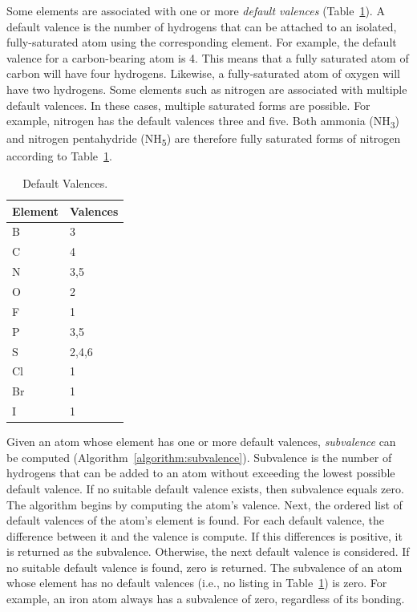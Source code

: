 \documentclass{article}
\begin{document}
Some elements are associated with one or more \textit{default valences} (Table~\ref{table:default-valences}). A default valence is the number of hydrogens that can be attached to an isolated, fully-saturated atom using the corresponding element. For example, the default valence for a carbon-bearing atom is 4. This means that a fully saturated atom of carbon will have four hydrogens. Likewise, a fully-saturated atom of oxygen will have two hydrogens. Some elements such as nitrogen are associated with multiple default valences. In these cases, multiple saturated forms are possible. For example, nitrogen has the default valences three and five. Both ammonia (NH\textsubscript{3}) and nitrogen pentahydride (NH\textsubscript{5}) are therefore fully saturated forms of nitrogen according to Table~\ref{table:default-valences}.

\begin{table}
    \caption{Default Valences.}
    \centering
    \begin{tabular}{l l}
        \hline
        Element & Valences \\
        \hline
        B & 3 \\
        C & 4 \\
        N & 3,5 \\
        O & 2 \\
        F & 1 \\
        P & 3,5 \\
        S & 2,4,6 \\
        Cl & 1 \\
        Br & 1 \\
        I & 1 \\
        \hline
    \end{tabular}
    \label{table:default-valences}
\end{table}

Given an atom whose element has one or more default valences, \textit{subvalence} can be computed (Algorithm~\ref{algorithm:subvalence}). Subvalence is the number of hydrogens that can be added to an atom without exceeding the lowest possible default valence. If no suitable default valence exists, then subvalence equals zero. The algorithm begins by computing the atom's valence. Next, the ordered list of default valences of the atom's element is found. For each default valence, the difference between it and the valence is compute. If this differences is positive, it is returned as the subvalence. Otherwise, the next default valence is considered. If no suitable default valence is found, zero is returned. The subvalence of an atom whose element has no default valences (i.e., no listing in Table~\ref{table:default-valences}) is zero. For example, an iron atom always has a subvalence of zero, regardless of its bonding.
\end{document}
